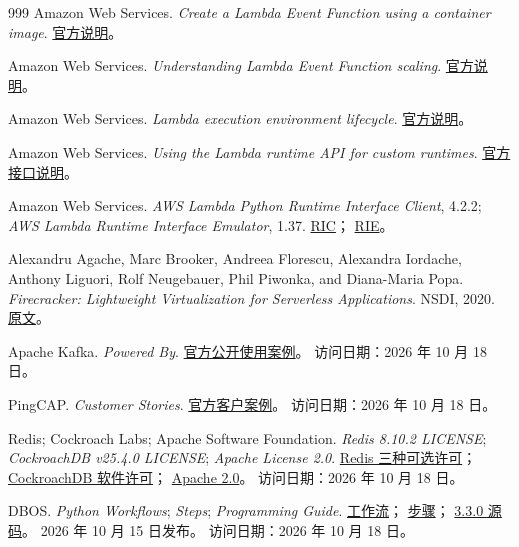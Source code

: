 \begin{thebibliography}{999}
Amazon Web Services.
\textit{Create a Lambda Event Function using a container image}.
\href{https://docs.aws.amazon.com/lambda/latest/dg/images-create.html}{官方说明}。

Amazon Web Services.
\textit{Understanding Lambda Event Function scaling}.
\href{https://docs.aws.amazon.com/lambda/latest/dg/lambda-concurrency.html}{官方说明}。

Amazon Web Services.
\textit{Lambda execution environment lifecycle}.
\href{https://docs.aws.amazon.com/lambda/latest/dg/lambda-runtime-environment.html}{官方说明}。

Amazon Web Services.
\textit{Using the Lambda runtime API for custom runtimes}.
\href{https://docs.aws.amazon.com/lambda/latest/dg/runtimes-api.html}{官方接口说明}。

Amazon Web Services.
\textit{AWS Lambda Python Runtime Interface Client}, 4.2.2;
\textit{AWS Lambda Runtime Interface Emulator}, 1.37.
\href{https://github.com/aws/aws-lambda-python-runtime-interface-client/tree/4.2.2}{RIC}；
\href{https://github.com/aws/aws-lambda-runtime-interface-emulator/tree/v1.37}{RIE}。

Alexandru Agache, Marc Brooker, Andreea Florescu, Alexandra Iordache,
Anthony Liguori, Rolf Neugebauer, Phil Piwonka, and Diana-Maria Popa.
\textit{Firecracker: Lightweight Virtualization for Serverless Applications}.
NSDI, 2020.
\href{https://www.usenix.org/system/files/nsdi20-paper-agache.pdf}{原文}。

Apache Kafka. \textit{Powered By}.
\href{https://kafka.apache.org/powered-by}{官方公开使用案例}。
访问日期：2026 年 10 月 18 日。

PingCAP. \textit{Customer Stories}.
\href{https://www.pingcap.com/customers/}{官方客户案例}。
访问日期：2026 年 10 月 18 日。

Redis; Cockroach Labs; Apache Software Foundation.
\textit{Redis 8.10.2 LICENSE}; \textit{CockroachDB v25.4.0 LICENSE};
\textit{Apache License 2.0}.
\href{https://github.com/redis/redis/blob/8.10.2/LICENSE.txt}{Redis 三种可选许可}；
\href{https://github.com/cockroachdb/cockroach/blob/v25.4.0/LICENSE}{CockroachDB 软件许可}；
\href{https://www.apache.org/licenses/LICENSE-2.0}{Apache 2.0}。
访问日期：2026 年 10 月 18 日。

DBOS. \textit{Python Workflows}; \textit{Steps}; \textit{Programming Guide}.
\href{https://docs.dbos.dev/python/tutorials/workflow-tutorial}{工作流}；
\href{https://docs.dbos.dev/python/tutorials/step-tutorial}{步骤}；
\href{https://github.com/dbos-inc/dbos-transact-py/tree/3.3.0}{3.3.0 源码}。
2026 年 10 月 15 日发布。
访问日期：2026 年 10 月 18 日。


\end{thebibliography}
